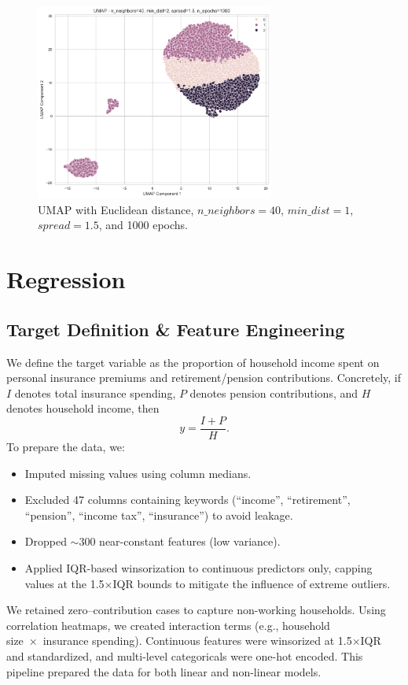 \documentclass{article}
\begin{document}
\begin{figure}[H]
    \centering
    \includegraphics[width=0.7\textwidth]{figures/output3.png}
    \caption{UMAP with Euclidean distance, $n\_neighbors=40$, $min\_dist=1$, $spread=1.5$, and 1000 epochs.}
    \label{fig:umap_final}
\end{figure}


\section{Regression}
\subsection*{Target Definition \& Feature Engineering}
We define the target variable as the proportion of household income spent on personal insurance premiums and retirement/pension contributions. Concretely, if $I$ denotes total insurance spending, $P$ denotes pension contributions, and $H$ denotes household income, then
\[
  y = \frac{I + P}{H}.
\]
To prepare the data, we:
\begin{itemize}
  \item Imputed missing values using column medians.
  \item Excluded 47 columns containing keywords (``income'', ``retirement'', ``pension'', ``income tax'', ``insurance'') to avoid leakage.
  \item Dropped $\sim$300 near-constant features (low variance).
  \item Applied IQR-based winsorization to continuous predictors only, capping values at the 1.5\(\times\)IQR bounds to mitigate the influence of extreme outliers.
\end{itemize}

We retained zero–contribution cases to capture non-working households. Using correlation heatmaps, we created interaction terms (e.g., household size × insurance spending). Continuous features were winsorized at 1.5×IQR and standardized, and multi-level categoricals were one-hot encoded. This pipeline prepared the data for both linear and non-linear models.
\end{document}
